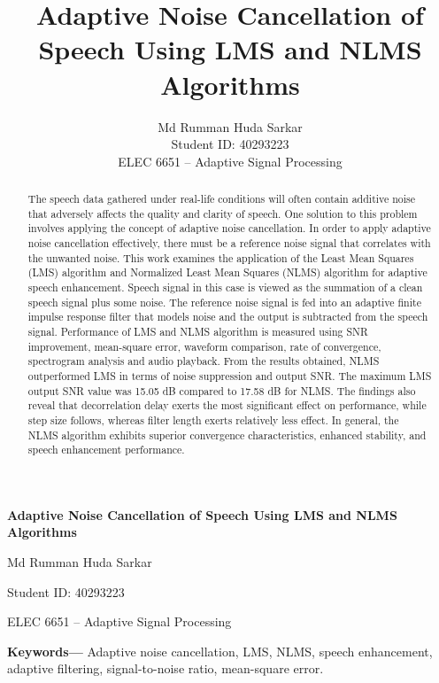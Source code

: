 \documentclass[12pt]{article}
\title{Adaptive Noise Cancellation of Speech Using LMS and NLMS Algorithms}
\author{Md Rumman Huda Sarkar\\Student ID: 40293223\\ELEC 6651 -- Adaptive Signal Processing}
\date{}
\begin{document}
\begin{titlepage}
    \centering
    \vspace*{1.5in}
    {\Large\bfseries Adaptive Noise Cancellation of Speech Using LMS and NLMS Algorithms\par}
    \vspace{1.2in}
    {\large Md Rumman Huda Sarkar\par}
    \vspace{0.2in}
    {\large Student ID: 40293223\par}
    \vspace{0.2in}
    {\large ELEC 6651 -- Adaptive Signal Processing\par}
    \vfill
\end{titlepage}

\tableofcontents
\newpage
\begin{abstract}
The speech data gathered under real-life conditions will often contain additive noise that adversely affects the quality and clarity of speech. One solution to this problem involves applying the concept of adaptive noise cancellation. In order to apply adaptive noise cancellation effectively, there must be a reference noise signal that correlates with the unwanted noise. This work examines the application of the Least Mean Squares (LMS) algorithm and Normalized Least Mean Squares (NLMS) algorithm for adaptive speech enhancement. Speech signal in this case is viewed as the summation of a clean speech signal plus some noise. The reference noise signal is fed into an adaptive finite impulse response filter that models noise and the output is subtracted from the speech signal. Performance of LMS and NLMS algorithm is measured using SNR improvement, mean-square error, waveform comparison, rate of convergence, spectrogram analysis and audio playback. From the results obtained, NLMS outperformed LMS in terms of noise suppression and output SNR. The maximum LMS output SNR value was 15.05 dB compared to 17.58 dB for NLMS. The findings also reveal that decorrelation delay exerts the most significant effect on performance, while step size follows, whereas filter length exerts relatively less effect. In general, the NLMS algorithm exhibits superior convergence characteristics, enhanced stability, and speech enhancement performance.
\end{abstract}

\noindent\textbf{Keywords---}
Adaptive noise cancellation, LMS, NLMS, speech enhancement, adaptive filtering, signal-to-noise ratio, mean-square error.
\par\vspace{1em}
\end{document}
